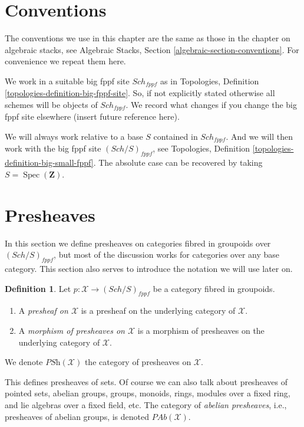 \documentclass{stacks-project}
\theoremstyle{plain}
\theoremstyle{definition}
\newtheorem{definition}[subsection]{Definition}
\theoremstyle{remark}
\numberwithin{equation}{subsection}
\def\Spec{\mathop{\mathrm{Spec}}}
\def\Sch{\mathit{Sch}}
\begin{document}
\section{Conventions}
\label{section-conventions}

\noindent
The conventions we use in this chapter are the same as those in the
chapter on algebraic stacks, see
Algebraic Stacks, Section \ref{algebraic-section-conventions}.
For convenience we repeat them here.

\medskip\noindent
We work in a suitable big fppf site $\Sch_{fppf}$ as in
Topologies, Definition \ref{topologies-definition-big-fppf-site}.
So, if not explicitly stated otherwise all schemes will be objects
of $\Sch_{fppf}$. We record what changes if you change the big
fppf site elsewhere (insert future reference here).

\medskip\noindent
We will always work relative to a base $S$ contained in $\Sch_{fppf}$.
And we will then work with the big fppf site $(\Sch/S)_{fppf}$, see
Topologies, Definition \ref{topologies-definition-big-small-fppf}.
The absolute case can be recovered by taking
$S = \Spec(\mathbf{Z})$.





\section{Presheaves}
\label{section-presheaves}

\noindent
In this section we define presheaves on categories fibred in groupoids
over $(\Sch/S)_{fppf}$, but most of the discussion works
for categories over any base category. This section also serves to
introduce the notation we will use later on.

\begin{definition}
\label{definition-presheaves}
Let $p : \mathcal{X} \to (\Sch/S)_{fppf}$ be a category fibred in
groupoids.
\begin{enumerate}
\item A {\it presheaf on $\mathcal{X}$} is a presheaf on the
underlying category of $\mathcal{X}$.
\item A {\it morphism of presheaves on $\mathcal{X}$} is a morphism of
presheaves on the underlying category of $\mathcal{X}$.
\end{enumerate}
We denote $\textit{PSh}(\mathcal{X})$ the category of presheaves on
$\mathcal{X}$.
\end{definition}

\noindent
This defines presheaves of sets. Of course we can also talk about
presheaves of pointed sets, abelian groups, groups, monoids, rings,
modules over a fixed ring, and lie algebras over a fixed field, etc.
The category of {\it abelian presheaves}, i.e., presheaves of abelian
groups, is denoted $\textit{PAb}(\mathcal{X})$.
\end{document}
